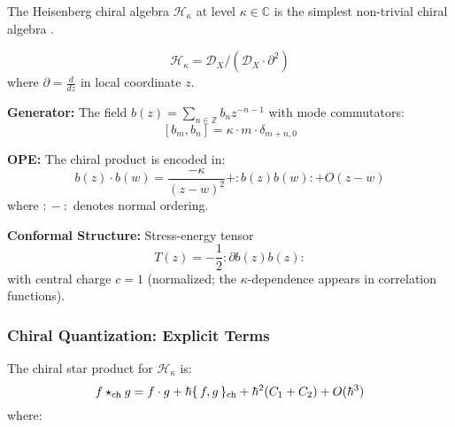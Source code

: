 The Heisenberg chiral algebra $\mathcal{H}_\kappa$ at level $\kappa \in \mathbb{C}$ is the simplest non-trivial chiral algebra \cite{BD04, FBZ04}.

\begin{definition}
$$\mathcal{H}_\kappa = \mathcal{D}_X / (\mathcal{D}_X \cdot \partial^2)$$
where $\partial = \frac{d}{dz}$ in local coordinate $z$.
\end{definition}

\textbf{Generator:} The field $b(z) = \sum_{n \in \mathbb{Z}} b_n z^{-n-1}$ with mode commutators:
$$[b_m, b_n] = \kappa \cdot m \cdot \delta_{m+n,0}$$

\textbf{OPE:} The chiral product is encoded in:
$$b(z) \cdot b(w) = \frac{-\kappa}{(z-w)^2} + :\!b(z)b(w)\!: + O(z-w)$$
where $:\!-\!:$ denotes normal ordering.

\textbf{Conformal Structure:} Stress-energy tensor
$$T(z) = -\frac{1}{2}:\!\partial b(z) b(z)\!:$$
with central charge $c = 1$ (normalized; the $\kappa$-dependence appears in correlation functions).

\subsubsection{Chiral Quantization: Explicit Terms}

The chiral star product for $\mathcal{H}_\kappa$ is:
$$f \star_{\text{ch}} g = f \cdot g + \hbar \{\,f,g\,\}_{\text{ch}} + \hbar^2 (C_1 + C_2) + O(\hbar^3)$$
where:

